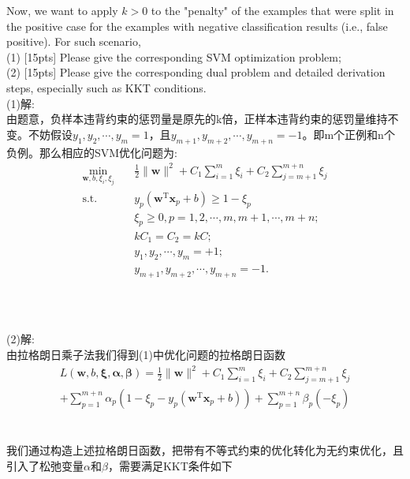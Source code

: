 \documentclass{article}
\begin{document}
    Now, we want to apply $k>0$ to the "penalty" of the examples that were split in the positive case for the examples with negative classification results (i.e., false positive). For such scenario,\\
   (1) [15pts] Please give the corresponding SVM optimization problem;\\
   (2) [15pts] Please give the corresponding dual problem and detailed derivation steps, especially such as KKT conditions.
\\(1)解:\\由题意，负样本违背约束的惩罚量是原先的k倍，正样本违背约束的惩罚量维持不变。不妨假设$y_1,y_2,\cdots,y_m=1$，且$y_{m+1},y_{m+2},\cdots,y_{m+n}=-1$。即m个正例和n个负例。那么相应的SVM优化问题为:
\\
    \begin{equation}
    	\label{eq-svm-op}
    	\begin{split}
    		\min_{\mathbf{w},b,\xi_i,\xi_j}& \quad \frac{1}{2} \lVert \mathbf{w} \rVert^2 + C_1\sum_{i=1}^m\xi_i + C_2\sum_{j=m+1}^{m+n}\xi_j\\
    		\text{s.t.}&  \quad y_p(\mathbf{w}^\mathrm{T}\mathbf{x}_p + b)\geq 1-\xi_p\\
    		& \quad \xi_p \geq 0, p = 1,2,\cdots,m,m+1,\cdots,m+n;\\
			& \quad kC_1=C_2=kC;\\
			& \quad y_1,y_2,\cdots,y_m=+1;\\
			& \quad y_{m+1},y_{m+2},\cdots,y_{m+n}=-1.\\
    	\end{split}
    \end{equation}
\\\\\\(2)解:\\	由拉格朗日乘子法我们得到(1)中优化问题的拉格朗日函数\\
\begin{equation}
    	\label{eq-svm-la}
    	\begin{split}
    		L(\bm{w},b,\bm{\xi},\bm{\alpha},\bm{\beta})=\frac{1}{2}\lVert\bm{w}\rVert^2+C_1\sum_{i=1}^m\xi_i + C_2\sum_{j=m+1}^{m+n}\xi_j\\+\sum_{p=1}^{m+n}\alpha_p(1-\xi_p-y_p(\mathbf{w}^\mathrm{T}\mathbf{x}_p + b))+\sum_{p=1}^{m+n}\beta_p(-\xi_p)
    	\end{split}
    \end{equation}
\\\\我们通过构造上述拉格朗日函数，把带有不等式约束的优化转化为无约束优化，且引入了松弛变量$\alpha$和$\beta$，需要满足KKT条件如下\\
\end{document}
